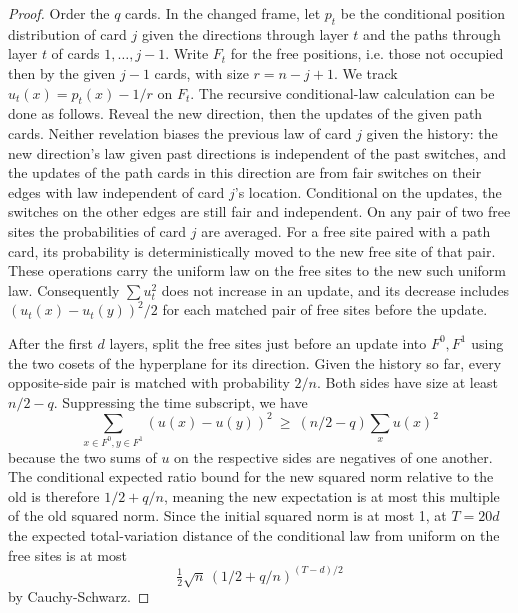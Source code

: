 \begin{proof}
Order the \(q\) cards. In the changed frame, let \(p_t\) be the conditional position distribution of card \(j\) given the directions through layer \(t\) and the paths through layer \(t\) of cards \(1,\ldots,j-1\). Write \(F_t\) for the free positions, i.e. those not occupied then by the given \(j-1\) cards, with size \(r=n-j+1\). We track \(u_t(x)=p_t(x)-1/r\) on \(F_t\). The recursive conditional-law calculation can be done as follows. Reveal the new direction, then the updates of the given path cards. Neither revelation biases the previous law of card \(j\) given the history: the new direction's law given past directions is independent of the past switches, and the updates of the path cards in this direction are from fair switches on their edges with law independent of card \(j\)'s location. Conditional on the updates, the switches on the other edges are still fair and independent. On any pair of two free sites the probabilities of card \(j\) are averaged. For a free site paired with a path card, its probability is deterministically moved to the new free site of that pair. These operations carry the uniform law on the free sites to the new such uniform law. Consequently \(\sum u_t^2\) does not increase in an update, and its decrease includes \((u_t(x)-u_t(y))^2/2\) for each matched pair of free sites before the update.

After the first \(d\) layers, split the free sites just before an update into \(F^0,F^1\) using the two cosets of the hyperplane for its direction. Given the history so far, every opposite-side pair is matched with probability \(2/n\). Both sides have size at least \(n/2-q\). Suppressing the time subscript, we have
\[
 \sum_{x\in F^0,y\in F^1}(u(x)-u(y))^2\ \ge\ (n/2-q)\sum_x u(x)^2
\]
because the two sums of \(u\) on the respective sides are negatives of one another. The conditional expected ratio bound for the new squared norm relative to the old is therefore \(1/2+q/n\), meaning the new expectation is at most this multiple of the old squared norm. Since the initial squared norm is at most 1, at \(T=20d\) the expected total-variation distance of the conditional law from uniform on the free sites is at most
\[
 \tfrac12\sqrt{n}\,(1/2+q/n)^{(T-d)/2}
\]
by Cauchy-Schwarz.


\end{proof}
